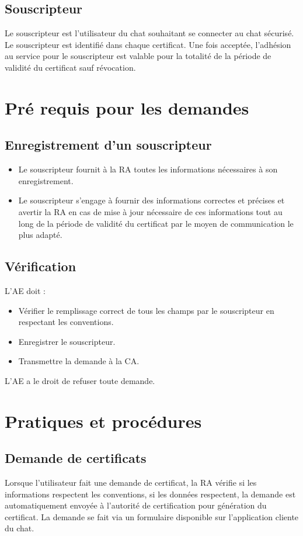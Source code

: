 \documentclass[a4paper,11pt,french]{book}
\begin{document}
\subsection{Souscripteur}
Le souscripteur est l’utilisateur du chat souhaitant se connecter au chat sécurisé. Le souscripteur est identifié dans chaque certificat. Une fois acceptée, l’adhésion au service pour le souscripteur est valable pour la totalité de la période de validité du certificat sauf révocation.

\section{Pré requis pour les demandes}
\subsection{Enregistrement d'un souscripteur}
\begin{itemize}
\item Le souscripteur fournit à la RA toutes les informations nécessaires à son enregistrement. 
\item Le souscripteur s'engage à fournir des informations correctes et précises et avertir la RA en cas de mise à jour nécessaire de ces informations tout au long de la période de validité du certificat par le moyen de communication le plus adapté.
\end{itemize}

\subsection{Vérification}
L’AE doit :
\begin{itemize}
\item Vérifier le remplissage correct de tous les champs par le souscripteur en respectant les conventions.
\item Enregistrer le souscripteur.
\item Transmettre la demande à la CA.
\end{itemize}
L’AE a le droit de refuser toute demande.

\section{Pratiques et procédures}
\subsection{Demande de certificats}
Lorsque l'utilisateur fait une demande de certificat, la RA vérifie si les informations respectent les conventions, si les données
respectent, la demande est automatiquement envoyée à l'autorité de certification pour génération du certificat. La demande se fait via un formulaire disponible sur l'application cliente du chat.
\end{document}
